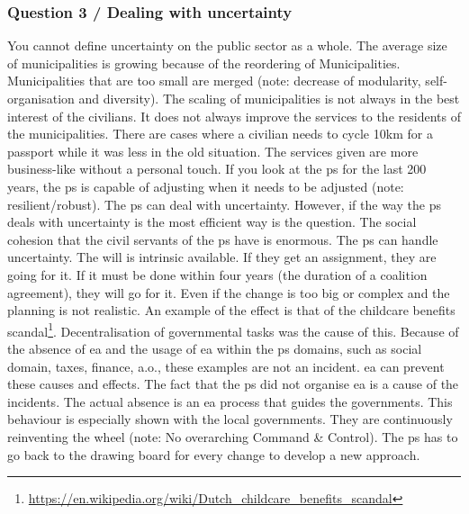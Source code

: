 \subsubsection{Question 3 / Dealing with uncertainty}
You cannot define uncertainty on the public sector as a whole. The average size of municipalities is growing because of the reordering of Municipalities. Municipalities that are too small are merged (note: decrease of modularity, self-organisation and diversity). The scaling of municipalities is not always in the best interest of the civilians. It does not always improve the services to the residents of the municipalities. There are cases where a civilian needs to cycle 10km for a passport while it was less in the old situation. The services given are more business-like without a personal touch. If you look at the \gls{ps} for the last 200 years, the \gls{ps} is capable of adjusting when it needs to be adjusted (note: resilient/robust). The \gls{ps} can deal with uncertainty. However, if the way the \gls{ps} deals with uncertainty is the most efficient way is the question. The social cohesion that the civil servants of the \gls{ps} have is enormous. The \gls{ps} can handle uncertainty. The will is intrinsic available. If they get an assignment, they are going for it. If it must be done within four years (the duration of a coalition agreement), they will go for it. Even if the change is too big or complex and the planning is not realistic.
An example of the effect is that of the childcare benefits scandal\footnote{\url{https://en.wikipedia.org/wiki/Dutch_childcare_benefits_scandal}}. Decentralisation of governmental tasks was the cause of this. Because of the absence of \acrshort{ea} and the usage of \acrshort{ea} within the \acrshort{ps} domains, such as social domain, taxes, finance, a.o., these examples are not an incident. \acrshort{ea} can prevent these causes and effects. The fact that the \gls{ps} did not organise \acrshort{ea} is a cause of the incidents. The actual absence is an \acrshort{ea} process that guides the governments. This behaviour is especially shown with the local governments. They are continuously reinventing the wheel (note: No overarching Command \& Control). The \gls{ps} has to go back to the drawing board for every change to develop a new approach.
